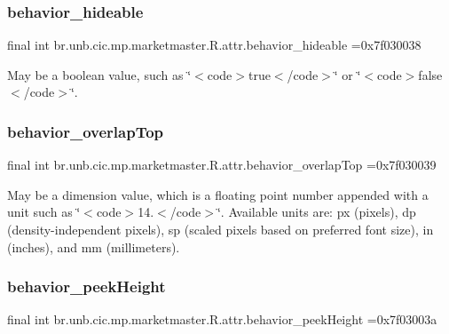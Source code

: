 \subsubsection{\texorpdfstring{behavior\+\_\+hideable}{behavior\_hideable}}
{\footnotesize\ttfamily final int br.\+unb.\+cic.\+mp.\+marketmaster.\+R.\+attr.\+behavior\+\_\+hideable =0x7f030038\hspace{0.3cm}{\ttfamily [static]}}

May be a boolean value, such as \char`\"{}$<$code$>$true$<$/code$>$\char`\"{} or \char`\"{}$<$code$>$false$<$/code$>$\char`\"{}. \mbox{\label{classbr_1_1unb_1_1cic_1_1mp_1_1marketmaster_1_1R_1_1attr_a050d77fd023d1567a53d031d098bd8aa}} 
\subsubsection{\texorpdfstring{behavior\+\_\+overlap\+Top}{behavior\_overlapTop}}
{\footnotesize\ttfamily final int br.\+unb.\+cic.\+mp.\+marketmaster.\+R.\+attr.\+behavior\+\_\+overlap\+Top =0x7f030039\hspace{0.3cm}{\ttfamily [static]}}

May be a dimension value, which is a floating point number appended with a unit such as \char`\"{}$<$code$>$14.\+5sp$<$/code$>$\char`\"{}. Available units are\+: px (pixels), dp (density-\/independent pixels), sp (scaled pixels based on preferred font size), in (inches), and mm (millimeters). \mbox{\label{classbr_1_1unb_1_1cic_1_1mp_1_1marketmaster_1_1R_1_1attr_ae63110dc65741b58829c6ad9062ef06d}} 
\subsubsection{\texorpdfstring{behavior\+\_\+peek\+Height}{behavior\_peekHeight}}
{\footnotesize\ttfamily final int br.\+unb.\+cic.\+mp.\+marketmaster.\+R.\+attr.\+behavior\+\_\+peek\+Height =0x7f03003a\hspace{0.3cm}{\ttfamily [static]}}

